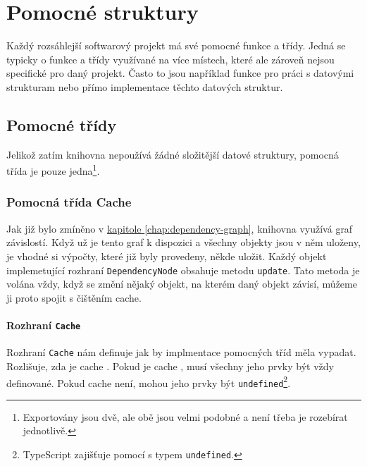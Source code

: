 \chapter{Pomocné struktury}
\label{chap:helpers}

Každý rozsáhlejší softwarový projekt má své pomocné funkce a třídy. 
Jedná se typicky o funkce a třídy využívané na více místech, které ale zároveň nejsou specifické pro daný projekt.
Často to jsou například funkce pro práci s datovými strukturam nebo přímo implementace těchto datových struktur.

\section{Pomocné třídy}
\label{sec:helper-classes}

Jelikož zatím knihovna nepoužívá žádné složitější datové struktury, pomocná třída je pouze jedna\footnote{Exportovány jsou dvě, ale obě jsou velmi podobné a není třeba je rozebírat jednotlivě.}\cite{geometryjs:source:helpers:memoryMapCache.ts}.

\subsection[Cache]{Pomocná třída Cache}
\label{subsec:helper-class-cache}

Jak již bylo zmíněno v \hyperref[chap:dependency-graph]{kapitole \ref*{chap:dependency-graph}}, knihovna využívá graf závislostí.
Když už je tento graf k dispozici a všechny objekty jsou v něm uloženy, je vhodné si výpočty, které již byly provedeny, někde uložit.
Každý objekt implemetující rozhraní \texttt{DependencyNode} obsahuje metodu \texttt{update}\cite[line 26]{geometryjs:source:interfaces:dependencyNode.ts}.
Tato metoda je volána vždy, když se změní nějaký objekt, na kterém daný objekt závisí, můžeme ji proto spojit s čištěním cache.

\subsubsection[Rozhraní]{Rozhraní \texttt{Cache}}
\label{subsubsec:helper-class-cache-interface}

Rozhraní \texttt{Cache}\cite{geometryjs:source:interfaces:cache.ts} nám definuje jak by implmentace pomocných tříd měla vypadat.
Rozlišuje, zda je cache .
Pokud je cache , musí všechny jeho prvky být vždy definované.
Pokud cache  není, mohou jeho prvky být \texttt{undefined}\footnote{TypeScript zajišťuje  pomocí  s typem \texttt{undefined}.}.

